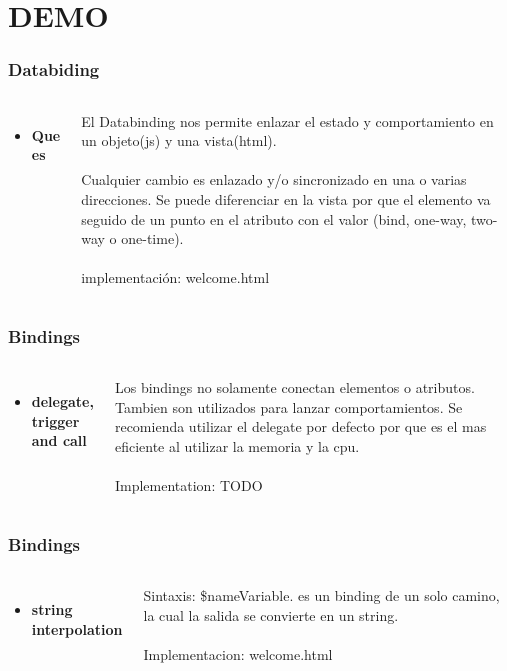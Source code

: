 \documentclass{beamer}
\begin{document}
\section{DEMO}
\begin{frame}
\frametitle{Databiding}
\begin{columns}[c] 

\begin{itemize}
\item \textbf{Que es}
\end{itemize}

El Databinding nos permite enlazar el estado y comportamiento en un objeto(js) y una vista(html).
\\~\\
Cualquier cambio es enlazado y/o sincronizado en una o varias direcciones. Se puede diferenciar en la vista por que el elemento va seguido de un punto en el atributo con el valor (bind, one-way, two-way o one-time).
\\~\\
implementación: welcome.html
\end{columns}
\end{frame}
\begin{frame}
\frametitle{Bindings}
\begin{columns}[c]

\begin{itemize}
\item \textbf{delegate, trigger and call}
\end{itemize}

Los bindings no solamente conectan elementos o atributos. Tambien son utilizados para lanzar comportamientos.
Se recomienda utilizar el delegate por defecto por que es el mas eficiente al utilizar la memoria y la cpu. 
\\~\\
Implementation: TODO
\end{columns}
\end{frame}
\begin{frame}
\frametitle{Bindings}
\begin{columns}[c]

\begin{itemize}
\item \textbf{string interpolation}
\end{itemize}

Sintaxis: \${nameVariable}. es un binding de un solo camino, la cual la salida se convierte en un string.
\\~\\
Implementacion: welcome.html
\end{columns}
\end{frame}
\end{document}
